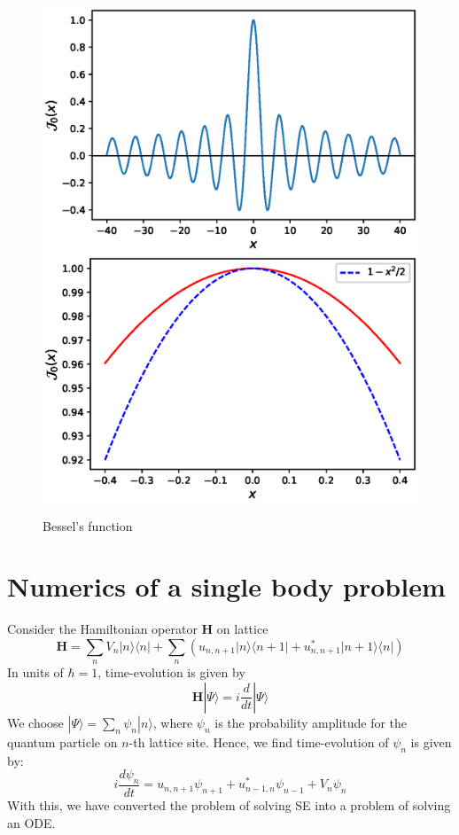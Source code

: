 \documentclass[11pt,a4paper]{article}
\begin{document}
\begin{figure}[!ht]
\begin{center}
\includegraphics[scale=0.5]{pics/bessel_fun.eps} 
\includegraphics[scale=0.5]{pics/bessel_fun_zoom.eps} 
\caption{Bessel's function }
\end{center}
\end{figure}

\section{Numerics of a single body problem}

Consider the Hamiltonian operator $\mathbf{H}$ on lattice 
\begin{equation}
\mathbf{H}= \sum_n V_n |n \rangle \langle n| + \sum_n (u_{n,n+1}|n \rangle \langle n+ 1|  + u_{n,n+1}^*|n +1 \rangle \langle n|)
\end{equation}
In units of $\hbar=1$, time-evolution is given by 
\begin{equation}
\mathbf{H} | \Psi \rangle= i\dfrac{d}{dt} | \Psi \rangle
\label{shrod eqn}
\end{equation}
We choose $| \Psi \rangle= \sum_n \psi_n | n \rangle$, where $\psi_n$ is the probability amplitude for the quantum particle on $n$-th lattice site. Hence, we find time-evolution of $\psi_n$ is given by:
\begin{equation}
i\frac{d\psi_n}{dt} =   u_{n,n+1}\psi_{n+1} + u_{n-1,n}^* \psi_{n-1} + V_n \psi_n 
\end{equation}
With this, we have converted the problem of solving SE into a problem of solving an ODE.
\end{document}
